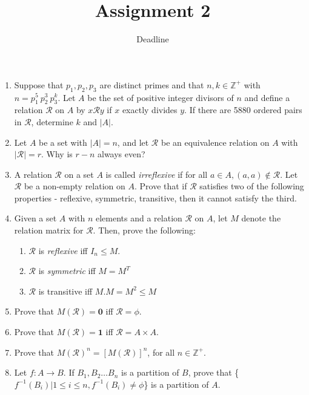 \documentclass[a4paper]{article}
\title{Assignment 2}
\author{Deadline \date{\displaydate{date}} }
\begin{document}
\maketitle


\begin{enumerate}

\item Suppose that $p_1,p_2,p_3$ are distinct primes and that $n,k \in \mathbb{Z}^+$ with $n=p_1^5\ p_2^3\ p_3^k$. Let $A$ be the set of positive integer divisors of $n$ and define a relation $\mathcal{R}$ on $A$ by $x\mathcal{R}y$ if $x$ exactly divides $y$. If there are 5880 ordered pairs in $\mathcal{R}$, determine $k$ and $|A|$. 

\item Let $A$ be a set with $|A|=n$, and let $\mathcal{R}$ be an equivalence relation on $A$ with $|\mathcal{R}| = r$. Why is $r-n$ always even?

\item A relation $\mathcal{R}$ on a set $A$ is called \textit{irreflexive} if for all $a \in A, (a,a) \notin \mathcal{R}$. Let $\mathcal{R}$ be a non-empty relation on $A$. Prove that if $\mathcal{R}$ satisfies two of the following properties - reflexive, symmetric, transitive, then it cannot satisfy the third.

\item Given a set $A$ with $n$ elements and a relation $\mathcal{R}$ on $A$, let $M$ denote the relation matrix for $\mathcal{R}$. Then, prove the following:
\begin{enumerate}
\item $\mathcal{R}$ is \textit{reflexive} iff $I_n \leq M$.
\item $\mathcal{R}$ is \textit{symmetric} iff $M=M^T$
\item $\mathcal{R}$ is transitive iff $M.M = M^2 \leq M$
\end{enumerate}

\item Prove that $M(\mathcal{R}) = \textbf{0}$ iff $\mathcal{R} = \phi$.

\item Prove that $M(\mathcal{R}) = \textbf{1}$ iff $\mathcal{R} = A \times A$.

\item Prove that $M(\mathcal{R})^n = [M(\mathcal{R})]^n$, for all $n \in \mathbb{Z}^+$. 

\item Let $f: A \rightarrow B$. If {$B_1,B_2 \dots B_n$} is a partition of $B$, prove that \{$f^{-1}(B_i)| 1\leq i \leq n, f^{-1}(B_i) \neq \phi $\} is a partition of $A$. 


\end{enumerate}
\end{document}
